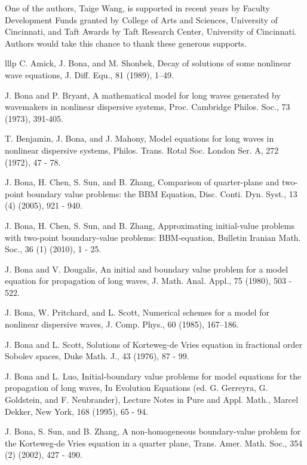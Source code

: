 \documentclass[10pt,a4paper,final]{article}
\numberwithin{equation}{section}
\begin{document}
\noindent One of the authors, Taige Wang, is supported in recent years by Faculty Development Funds granted by College of Arts and Sciences, University of Cincinnati, and Taft Awards by Taft Research Center, University of Cincinnati. Authors would take this chance to thank these generous supports. 

\begin{thebibliography}{lllp}
 C. Amick, J. Bona, and M. Shonbek, Decay of solutions of some nonlinear wave equations, J. Diff. Equ., 81 (1989),
1–49. 

  J. Bona and P. Bryant, A mathematical model for long waves generated by wavemakers in nonlinear dispersive systems, Proc. Cambridge Philos. Soc., 73
 (1973), 391-405.

 T. Benjamin, J. Bona, and J. Mahony, Model equations for long waves in nonlinear dispersive systems, Philos. Trans. Rotal Soc. London Ser. A, 272 (1972), 47 - 78.

 J. Bona, H. Chen, S. Sun, and B. Zhang, Comparison of quarter-plane and two-point boundary value problems: the BBM Equation, Disc. Conti. Dyn. Syst., 13 (4) (2005), 921 - 940. 

 J. Bona, H. Chen, S. Sun, and B. Zhang, Approximating initial-value problems with two-point boundary-value problems: BBM-equation, Bulletin Iranian Math. Soc., 36 (1) (2010), 1 - 25. 

 J. Bona and V. Dougalis, An initial and boundary value problem for a model equation for propagation of long waves, J. Math. Anal. Appl., 75 (1980), 503 - 522. 

  J. Bona, W. Pritchard, and L. Scott, Numerical schemes for a model for nonlinear dispersive waves, J. Comp. Phys., 60 (1985), 167–186.

 J. Bona and L. Scott, Solutions of Korteweg-de Vries equation in fractional order Sobolev spaces, Duke Math. J., 43 (1976), 87 - 99.  

 J. Bona and L. Luo, Initial-boundary value problems for model equations for the propagation of long waves, In Evolution Equations (ed. G. Gerreyra, G. Goldstein, and F. Neubrander), Lecture Notes in Pure and Appl. Math., Marcel Dekker, New York, 168 (1995), 65 - 94. 

 J. Bona, S. Sun, and B. Zhang, A non-homogeneous boundary-value problem for the Korteweg-de Vries equation in a quarter plane, Trans. Amer. Math. Soc., 354 (2) (2002), 427 - 490.


\end{thebibliography}
\end{document}

